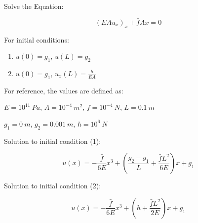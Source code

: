 \documentclass[letterpaper]{report}
\begin{document}
Solve the Equation:

\begin{equation}
\left(EA u_x \right)_x + \bar{f}Ax = 0
\end{equation}

For initial conditions:

\begin{enumerate}
\item $u(0) = g_1$, $u(L) = g_2$
\item $u(0) = g_1$, $u_x(L) = \frac{h}{EA}$
\end{enumerate}

For reference, the values are defined as:

\vspace{0.3in}
$E = 10^{11}~Pa$, $A = 10^{-4}~m^2$, $f = 10^{-4}~N$, $L = 0.1~m$

$g_1 = 0~m$, $g_2 = 0.001~m$, $h = 10^6~N$

\vspace{0.3in}
Solution to initial condition (1):

\begin{equation}
u(x) = -\frac{\bar{f}}{6E} x^3 + \left( \frac{g_2-g_1}{L} + \frac{\bar{f}L^2}{6E} \right) x + g_1
\end{equation}

Solution to initial condition (2):

\begin{equation}
u(x) = -\frac{\bar{f}}{6E} x^3 + \left( h+\frac{\bar{f}L^2}{2E} \right) x + g_1
\end{equation}
\end{document}
